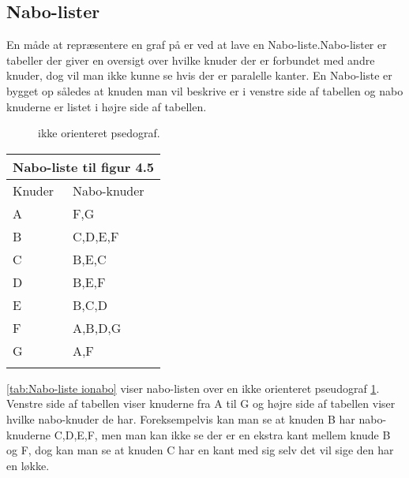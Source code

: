 \subsection{Nabo-lister}
En måde at repræsentere en graf på er ved at lave en Nabo-liste.Nabo-lister er tabeller der giver en oversigt over hvilke knuder der er forbundet med andre knuder, dog vil man ikke kunne se hvis der er paralelle kanter. En Nabo-liste er bygget op således at knuden man vil beskrive er i venstre side af tabellen og nabo knuderne er listet i højre side af tabellen. \\

\begin{figure}[h]
  \centering
  \caption{ikke orienteret psedograf\citep{dmat}.}
  \label{fig:ionabo}
\end{figure}

\begin{center}
	\begin{tabular}{ |p{4cm}||p{3cm}|}
	 	\hline
 		\multicolumn{2}{|c|}{Nabo-liste til figur 4.5} \\
 		\hline
 		Knuder & Nabo-knuder\\
 		\hline
 		A & F,G \\
		B & C,D,E,F \\
		C & B,E,C \\
		D & B,E,F \\
		E & B,C,D \\
		F & A,B,D,G \\
		G & A,F \\
 	\hline
 	\label{tab:Nabo-liste ionabo}
	\end{tabular}
\end{center}
\ref{tab:Nabo-liste ionabo} viser nabo-listen over en ikke orienteret pseudograf \ref{fig:ionabo}. Venstre side af tabellen viser knuderne fra A til G og højre side af tabellen viser hvilke nabo-knuder de har. Foreksempelvis kan man se at knuden B har nabo-knuderne C,D,E,F, men man kan ikke se der er en ekstra kant mellem knude B og F, dog kan man se at knuden C har en kant med sig selv det vil sige den har en løkke.

